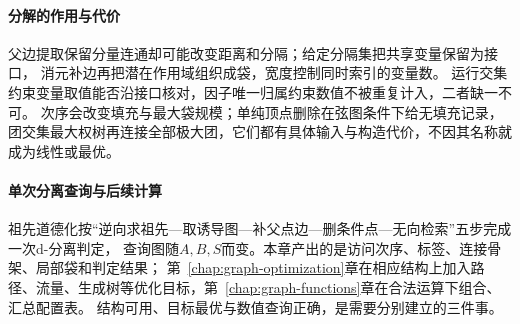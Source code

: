 \paragraph{分解的作用与代价}
父边提取保留分量连通却可能改变距离和分隔；给定分隔集把共享变量保留为接口，
消元补边再把潜在作用域组织成袋，宽度控制同时索引的变量数。
运行交集约束变量取值能否沿接口核对，因子唯一归属约束数值不被重复计入，二者缺一不可。
次序会改变填充与最大袋规模；单纯顶点删除在弦图条件下给无填充记录，
团交集最大权树再连接全部极大团，它们都有具体输入与构造代价，不因其名称就成为线性或最优。

\paragraph{单次分离查询与后续计算}
祖先道德化按“逆向求祖先—取诱导图—补父点边—删条件点—无向检索”五步完成一次d-分离判定，
查询图随$A,B,S$而变。本章产出的是访问次序、标签、连接骨架、局部袋和判定结果；
第~\ref{chap:graph-optimization}章在相应结构上加入路径、流量、生成树等优化目标，第~\ref{chap:graph-functions}章在合法运算下组合、汇总配置表。
结构可用、目标最优与数值查询正确，是需要分别建立的三件事。
